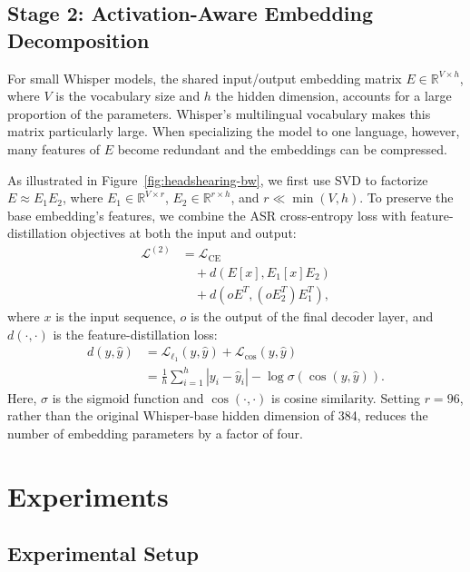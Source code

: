 \subsection{Stage 2: Activation-Aware Embedding Decomposition}

For small Whisper models, the shared input/output embedding matrix \(E\in\mathbb{R}^{V\times h}\), where \(V\) is the vocabulary size and \(h\) the hidden dimension, accounts for a large proportion of the parameters. Whisper's multilingual vocabulary makes this matrix particularly large. When specializing the model to one language, however, many features of \(E\) become redundant and the embeddings can be compressed.

As illustrated in Figure~\ref{fig:headshearing-bw}, we first use SVD to factorize \(E\approx E_1E_2\), where \(E_1\in\mathbb{R}^{V\times r}\), \(E_2\in\mathbb{R}^{r\times h}\), and \(r\ll\min(V,h)\). To preserve the base embedding's features, we combine the ASR cross-entropy loss with feature-distillation objectives at both the input and output:
\begin{align}
    \label{eq:distill-bw}
    \mathcal{L}^{(2)}
    &= \mathcal{L}_{\mathrm{CE}} \nonumber \\
    &\quad + d(E[x], E_1[x]E_2) \nonumber \\
    &\quad + d(oE^{T}, (oE_2^{T})E_1^{T}),
\end{align}
where \(x\) is the input sequence, \(o\) is the output of the final decoder layer, and \(d(\cdot,\cdot)\) is the feature-distillation loss:
\begin{align}
    \label{eq:distance-bw}
    d(y,\hat{y})
    &= \mathcal{L}_{\ell_1}(y,\hat{y})+\mathcal{L}_{\cos}(y,\hat{y}) \nonumber\\
    &= \frac{1}{h}\sum_{i=1}^{h}|y_i-\hat{y}_i|
       -\log \sigma\!\left(\cos(y,\hat{y})\right).
\end{align}
Here, \(\sigma\) is the sigmoid function and \(\cos(\cdot,\cdot)\) is cosine similarity. Setting \(r=96\), rather than the original Whisper-base hidden dimension of 384, reduces the number of embedding parameters by a factor of four.

\section{Experiments}

\subsection{Experimental Setup}

